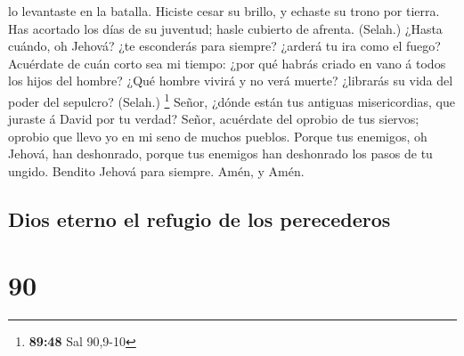 lo levantaste en la batalla.  Hiciste cesar su brillo, y
echaste su trono por tierra.  Has acortado los días de su
juventud; hasle cubierto de afrenta. (Selah.)  ¿Hasta
cuándo, oh Jehová? ¿te esconderás para siempre? ¿arderá tu ira como el
fuego?  Acuérdate de cuán corto sea mi tiempo: ¿por qué
habrás criado en vano á todos los hijos del hombre?  ¿Qué
hombre vivirá y no verá muerte? ¿librarás su vida del poder del
sepulcro? (Selah.) \footnote{\textbf{89:48} Sal 90,9-10} 
Señor, ¿dónde están tus antiguas misericordias, que juraste á David por
tu verdad?  Señor, acuérdate del oprobio de tus siervos;
oprobio que llevo yo en mi seno de muchos pueblos.  Porque
tus enemigos, oh Jehová, han deshonrado, porque tus enemigos han
deshonrado los pasos de tu ungido.  Bendito Jehová para
siempre. Amén, y Amén.

\hypertarget{dios-eterno-el-refugio-de-los-perecederos}{%
\subsection{Dios eterno el refugio de los
perecederos}\label{dios-eterno-el-refugio-de-los-perecederos}}

\hypertarget{section-89}{%
\section{90}\label{section-89}}

